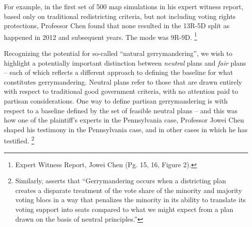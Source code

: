     For example, in the first set of 500 map simulations in his expert witness report, based only on traditional redistricting criteria, but not including voting rights protections, Professor Chen found that none resulted in the 13R-5D split as happened in 2012 and subsequent years. The mode was 9R-9D.
        \footnote{Expert Witness Report, Jowei Chen (Pg. 15, 16, Figure 2).}
\par
    Recognizing the potential for so-called ``natural gerrymandering'', we wish to highlight a potentially important distinction between \textit{neutral} plans and \textit{fair} plans -- each of which reflects a different approach to defining the baseline for what constitutes gerrymandering. Neutral plans refer to those that are drawn entirely with respect to traditional good government criteria, with no attention paid to partisan considerations. One way to define partisan gerrymandering is with respect to a baseline defined by the set of feasible neutral plans -- and this was how one of the plaintiff’s experts in the Pennsylvania case, Professor Jowei Chen \citep[cf.][]{Chen2015_JOP} shaped his testimony in the Pennsylvania case, and in other cases in which he has testified.
        \footnote{Similarly, \citet{Grofman2018_ELJ} asserts that ``Gerrymandering occurs when a districting plan creates a disparate treatment of the vote share of the minority and majority voting blocs in a way that penalizes the minority in its ability to translate its voting support into seats compared to what we might expect from a plan drawn on the basis of neutral principles.''}
